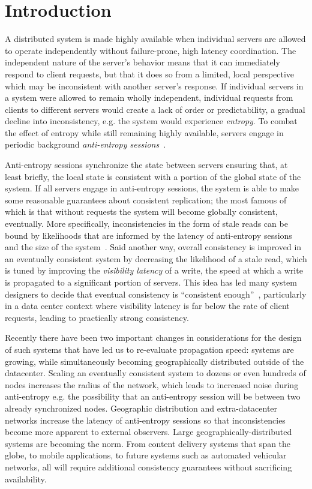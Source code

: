 \section*{Introduction}

A distributed system is made highly available when individual servers are
allowed to operate independently without failure-prone, high latency
coordination.
The independent nature of the server's behavior means that it can immediately
respond to client requests, but that it does so from a limited, local
perspective which may be inconsistent with another server's response.
If individual servers in a system were allowed to remain wholly independent,
individual requests from clients to different servers would create a lack of
order or predictability, a gradual decline into inconsistency, e.g. the
system would experience \textit{entropy}.
To combat the effect of entropy while still remaining highly available,
servers engage in periodic background \textit{anti-entropy
  sessions}~\cite{terry_session_1994}.

Anti-entropy sessions synchronize the state between servers ensuring that,
at least briefly, the local state is consistent with a portion of the global
state of the system.
If all servers engage in anti-entropy sessions, the system is able to make
some reasonable guarantees about consistent replication; the most famous
of which is that without requests the system will become
globally consistent, eventually.
More specifically, inconsistencies in the form of stale reads can be bound by
likelihoods that are informed by the latency of anti-entropy sessions and the
size of the system~\cite{bailis_quantifying_2014}.
Said another way, overall consistency is improved in an eventually consistent
system by decreasing the likelihood of a stale read, which is tuned by
improving the \textit{visibility latency} of a write, the speed at which a
write is propagated to a significant portion of servers.
This idea has led many system designers to decide that eventual consistency
is ``consistent enough''~\cite{bermbach_eventual_2011,wada_data_2011},
particularly in a data center context where visibility latency is far below
the rate of client requests, leading to practically strong consistency.

Recently there have been two important changes in considerations for the
design of such systems that have led us to re-evaluate propagation speed:
systems are growing, while simultaneously becoming geographically distributed
outside of the datacenter.
Scaling an eventually consistent system to dozens or even hundreds of nodes
increases the radius of the network, which leads to increased noise during
anti-entropy e.g. the possibility that an anti-entropy session will be
between two already synchronized nodes.
Geographic distribution and extra-datacenter networks increase the latency of
anti-entropy sessions so that inconsistencies become more apparent to
external observers.
Large geographically-distributed systems are becoming the norm.
From content delivery systems that span the globe, to mobile applications, to
future systems such as automated vehicular networks, all will require
additional consistency guarantees without sacrificing availability.


